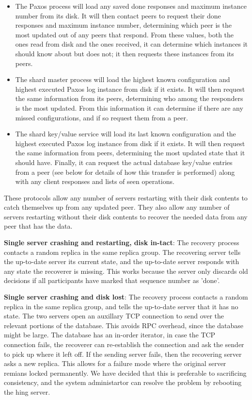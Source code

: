 \documentclass[letterpaper,10pt]{article}
\begin{document}
\begin{itemize}
\item The Paxos process will load any saved done responses and maximum instance number from its disk.   It will then contact peers to request their done responses and maximum instance number, determining which peer is the most updated out of any peers that respond.  From these values, both the ones read from disk and the ones received, it can determine which instances it should know about but does not; it then requests these instances from its peers.
\item The shard master process will load the highest known configuration and highest executed Paxos log instance from disk if it exists.  It will then request the same information from its peers, determining who among the responders is the most updated.  From this information it can determine if there are any missed configurations, and if so request them from a peer.  
\item The shard key/value service will load its last known configuration and the highest executed Paxos log instance from disk if it exists.  It will then request the same information from peers, determining the most updated state that it should have.  Finally, it can request the actual database key/value entries from a peer (see below for details of how this transfer is performed) along with any client responses and lists of seen operations.
\end{itemize}
These protocols allow any number of servers restarting with their disk contents to catch themselves up from any updated peer.  They also allow any number of servers restarting without their disk contents to recover the needed data from any peer that has the data.

\textbf{Single server crashing and restarting, disk in-tact}: The
recovery process contacts a random replica in the same replica group.
The recovering server tells the up-to-date server its current state,
and the up-to-date server responds with any state the recoverer is
missing. This works because the server only discards old decisions if
all participants have marked that sequence number as 'done'.

\textbf{Single server crashing and disk lost}: The recovery process
contacts a random replica in the same replica group, and tells the
up-to-date server that it has no state. The two servers open an
auxillary TCP connection to send over the relevant portions of the
database. This avoids RPC overhead, since the database might be large.
The database has an in-order iterator, in case the TCP connection
fails, the recoverer can re-establish the connection and ask the
sender to pick up where it left off. If the sending server fails, then
the recovering server asks a new replica. This allows for a failure
mode where the original server remians locked permanently. We have
decided that this is preferable to sacrificing consistency, and the
system administartor can resolve the problem by rebooting the hing
server.
\end{document}
